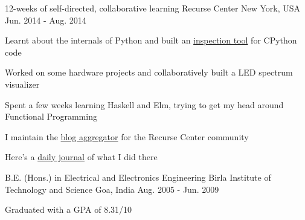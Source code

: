 

\begin{cventries}

  \cventry
      {12-weeks of self-directed, collaborative learning}
      {Recurse Center }
      {New York, USA} %
      {Jun. 2014 - Aug. 2014} %
      {
        \begin{cvitems} %
        \item {Learnt about the internals of Python and built an \href{https://github.com/punchagan/cinspect}{inspection tool} for CPython code}
        \item {Worked on some hardware projects and collaboratively built a LED spectrum visualizer}
        \item {Spent a few weeks learning Haskell and Elm, trying to get my head around Functional Programming}
        \item {I maintain the \href{https://github.com/recursecenter/blaggregator/commits?author=punchagan}{blog aggregator} for the Recurse Center community}
        \item {Here’s a \href{https://punchagan.muse-amuse.in/recurse-center/}{daily journal} of what I did there}
        \end{cvitems}
      }
  \cventry
      {B.E. (Hons.) in Electrical and Electronics Engineering} %
      {Birla Institute of Technology and Science } %
      {Goa, India} %
      {Aug. 2005 - Jun. 2009} %
      {
        \begin{cvitems} %
        \item {Graduated with a GPA of 8.31/10}
        \end{cvitems}
      }
\end{cventries}
